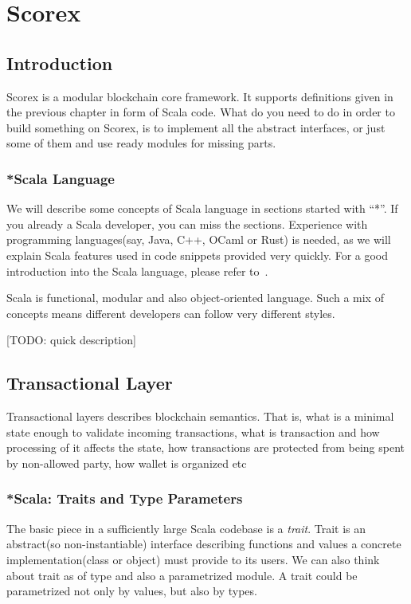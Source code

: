 \documentclass[]{report}   %
\begin{document}
\chapter{Scorex}           %
\section{Introduction}     %

Scorex is a modular blockchain core framework. It supports definitions given in the previous chapter in form of Scala code. What do you need to do in order to build something on Scorex, is to implement all the abstract interfaces, or just some of them and use ready modules for missing parts.

\subsection{*Scala Language}         %

We will describe some concepts of Scala language in sections started with ``*''. If you already a Scala developer, you can miss the sections. Experience with programming languages(say, Java, C++, OCaml or Rust) is needed, as we will explain Scala features used in code snippets provided very quickly. For a good introduction into the Scala language, please refer to~\cite{?}.

Scala is functional, modular and also object-oriented language. Such a mix of concepts means different developers can follow very different styles. 

[TODO: quick description]

\section{Transactional Layer}

Transactional layers describes blockchain semantics. That is, what is a minimal state enough to validate incoming transactions, what is transaction and how processing of it affects the state, how transactions are protected from being spent by non-allowed party, how wallet is organized etc

\subsection{*Scala: Traits and Type Parameters}

The basic piece in a sufficiently large Scala codebase is a \textit{trait}. Trait is an abstract(so non-instantiable) interface describing functions and values a concrete implementation(class or object) must provide to its users. We can also think about trait as of type and also a parametrized module. A trait could be parametrized not only by values, but also by types. 
\end{document}

